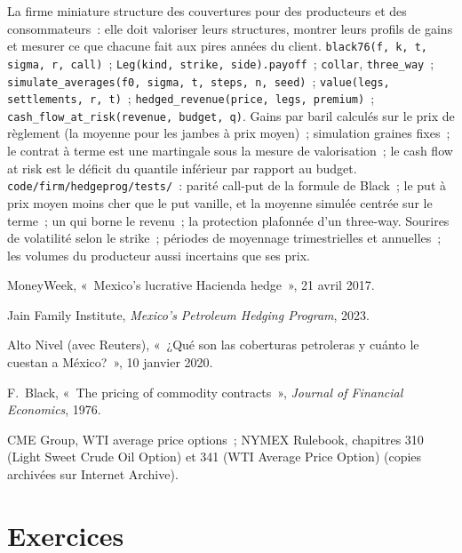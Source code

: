 \begin{build}
 La firme miniature structure des couvertures pour des producteurs et des consommateurs~: elle doit valoriser leurs structures, montrer leurs profils de gains
et mesurer ce que chacune fait aux pires années du client.
 \texttt{black76(f, k, t, sigma, r, call)}~; \texttt{Leg(kind, strike, side).payoff}~;
\texttt{collar}, \texttt{three\_way}~; \texttt{simulate\_averages(f0, sigma, t, steps, n, seed)}~;
\texttt{value(legs, settlements, r, t)}~; \texttt{hedged\_revenue(price, legs, premium)}~;
\texttt{cash\_flow\_at\_risk(revenue, budget, q)}.
 Gains par baril calculés sur le prix de règlement (la moyenne pour les jambes à prix moyen)~; simulation
graines fixes~; le contrat à terme est une martingale sous la mesure de valorisation~; le cash flow at risk est le déficit
du quantile inférieur par rapport au budget.
 \texttt{code/firm/hedgeprog/tests/}~: parité call-put de la formule de Black~; le put à prix moyen
moins cher que le put vanille, et la moyenne simulée centrée sur le terme~; un 
qui borne le revenu~; la protection plafonnée d'un three-way.
 Sourires de volatilité selon le strike~; périodes de moyennage trimestrielles et annuelles~; les volumes du producteur
aussi incertains que ses prix.
\end{build}

\begin{omsources}
\item MoneyWeek, «~Mexico's lucrative Hacienda hedge~», 21 avril 2017.
\item Jain Family Institute, \emph{Mexico's Petroleum Hedging Program}, 2023.
\item Alto Nivel (avec Reuters), «~¿Qué son las coberturas petroleras y cuánto le cuestan a México?~», 10 janvier 2020.
\item F.~Black, «~The pricing of commodity contracts~», \emph{Journal of Financial Economics}, 1976.
\item CME Group, WTI average price options~; NYMEX Rulebook, chapitres 310 (Light Sweet Crude Oil Option) et 341 (WTI Average
Price Option) (copies archivées sur Internet Archive).
\end{omsources}

\section{Exercices}


